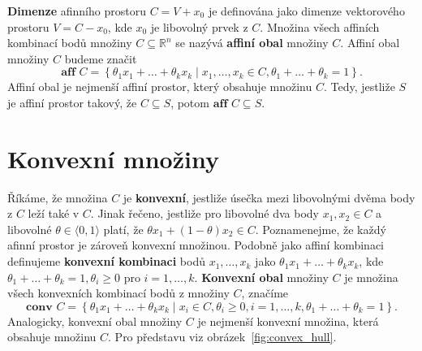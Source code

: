 \noindent \textbf{Dimenze} afinního prostoru $C = V + x_0$ je definována jako dimenze vektorového prostoru $V = C - x_0$, kde $x_0$ je libovolný prvek z $C$. Množina všech affiních kombinací bodů množiny $C \subseteq \mathbb{R}^n$ se nazývá \textbf{affiní obal} množiny $C$. Affiní obal množiny $C$ budeme značit
$$
    \textbf{aff } C = \left\{ \theta_1 x_1 + \dots + \theta_k x_k \mid x_1, \dots, x_k \in C, \theta_1 + \dots + \theta_k = 1 \right\}.
$$
Affiní obal je nejmenší affiní prostor, který obsahuje množinu $C$. Tedy, jestliže $S$ je affiní prostor takový, že $C \subseteq S$, potom $\textbf{aff }C \subseteq S$.


\section{Konvexní množiny}

Říkáme, že množina $C$ je \textbf{konvexní}, jestliže úsečka mezi libovolnými dvěma body z $C$ leží také v $C$. Jinak řečeno, jestliže pro libovolné dva body $x_1, x_2 \in C$ a libovolné $\theta \in \langle 0, 1 \rangle$ platí, že $\theta x_1 + (1 - \theta) x_2 \in C$. Poznamenejme, že každý afinní prostor je zároveň konvexní množinou. Podobně jako affiní kombinaci definujeme \textbf{konvexní kombinaci} bodů $x_1, \dots, x_k$ jako $\theta_1 x_1 + \dots + \theta_k x_k$, kde $\theta_1 + \dots + \theta_k = 1, \theta_i \geq 0$ pro $i = 1, \dots, k$. \textbf{Konvexní obal} množiny $C$ je množina všech konvexních kombinací bodů z množiny $C$, značíme
$$
    \textbf{conv }C = \left\{ \theta_1 x_1 + \dots + \theta_k x_k \mid x_i \in C, \theta_i \geq 0, i = 1, \dots, k, \theta_1 + \dots + \theta_k = 1 \right\}.
$$
Analogicky, konvexní obal množiny $C$ je nejmenší konvexní množina, která obsahuje množinu $C$. Pro představu viz obrázek~\ref{fig:convex_hull}.

